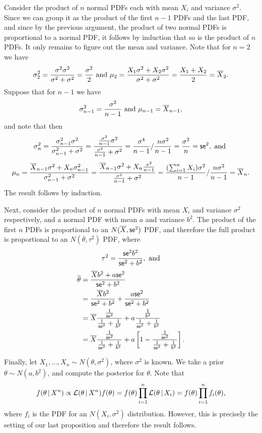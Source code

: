 \begin{ex}
  Consider the product of $n$ normal PDFs each with mean $X_i$ and variance
  $\sigma^2$. Since we can group it as the product of the first $n-1$ PDFs and
  the last PDF, and since by the previous argument, the product of two normal
  PDFs is proportional to a normal PDF, it follows by induction that so is the
  product of $n$ PDFs. It only remains to figure out the mean and variance.
  Note that for $n=2$ we have
  \[
    \sigma_2^2
    =\frac{\sigma^2\sigma^2}{\sigma^2+\sigma^2}=\frac{\sigma^2}{2}
    \text{ and }
    \mu_2
    =\frac{X_1\sigma^2+X_2\sigma^2}{\sigma^2+\sigma^2}
    =\frac{X_1+X_2}{2}
    =\overline{X}_2.
  \]
  Suppose that for $n-1$ we have
  \[
    \sigma_{n-1}^2=\frac{\sigma^2}{n-1}
    \text{ and }
    \mu_{n-1}=\overline{X}_{n-1},
  \]
  and note that then
  \[
    \sigma_n^2
    =\frac{\sigma_{n-1}^2\sigma^2}{\sigma_{n-1}^2+\sigma^2}
    =\frac{\frac{\sigma^2}{n-1}\sigma^2}{\frac{\sigma^2}{n-1}+\sigma^2}
    =\frac{\sigma^4}{n-1} / \frac{n\sigma^2}{n-1}
    =\frac{\sigma^2}{n}
    =\textsf{se}^2,\text{ and }
  \]
  \[
    \mu_n
    =\frac{\overline{X}_{n-1}\sigma^2+X_n\sigma_{n-1}^2}{\sigma_{n-1}^2+\sigma^2}
    =\frac{\overline{X}_{n-1}\sigma^2+X_n\frac{\sigma^2}{n-1}}{\frac{\sigma^2}{n-1}+\sigma^2}
    =\frac{(\sum_{i=1}^n X_i)\sigma^2}{n-1}/\frac{n\sigma^2}{n-1}
    =\overline{X}_n.
  \]
  The result follows by induction.

  Next, consider the product of $n$ normal PDFs with mean $X_i$ and
  variance $\sigma^2$ respectively, and a normal PDF with mean $a$ and variance
  $b^2$. The product of the first $n$ PDFs is proportional to an
  $N(\overline{X}, \textsf{se}^2)$ PDF, and therefore the full product is
  proportional to an $N(\overline{\theta}, \tau^2)$ PDF, where
  \[
    \tau^2=\frac{\textsf{se}^2b^2}{\textsf{se}^2+b^2},\text{ and}
  \]
  \begin{align*}
    \overline{\theta}
     & =\frac{\overline{X} b^2+a \textsf{se}^2}{\textsf{se}^2+b^2}                        \\
     & =\frac{\overline{X} b^2}{\textsf{se}^2+b^2}+\frac{a \textsf{se}^2}{\textsf{se}^2+b^2}      \\
     & =\overline{X}\frac{\frac{1}{\textsf{se}^2}}{\frac{1}{\textsf{se}^2}+\frac{1}{b^2}}
    +a\frac{\frac{1}{b^2}}{\frac{1}{\textsf{se}^2}+\frac{1}{b^2}}          \\
     & =\overline{X}\frac{\frac{1}{\textsf{se}^2}}{\frac{1}{\textsf{se}^2}+\frac{1}{b^2}}
    +a\left[1-\frac{\frac{1}{\textsf{se}^2}}{\frac{1}{\textsf{se}^2}+\frac{1}{b^2}}\right].
  \end{align*}

  Finally, let $X_1,\ldots,X_n\sim N(\theta,\sigma^2)$, where $\sigma^2$ is
  known. We take a prior $\theta\sim N(a, b^2)$, and compute the
  posterior for $\theta$. Note that
  \[
    f(\theta\,|\, X^n)
    \propto \mathcal{L}(\theta\,|\, X^n)f(\theta)
    = f(\theta)\prod_{i=1}^n\mathcal{L}(\theta\,|\, X_i)
    = f(\theta)\prod_{i=1}^n f_i(\theta),
  \]
  where $f_i$ is the PDF for an $N(X_i,\sigma^2)$ distribution. However, this is
  precisely the setting of our last proposition and therefore the result
  follows.
\end{ex}

